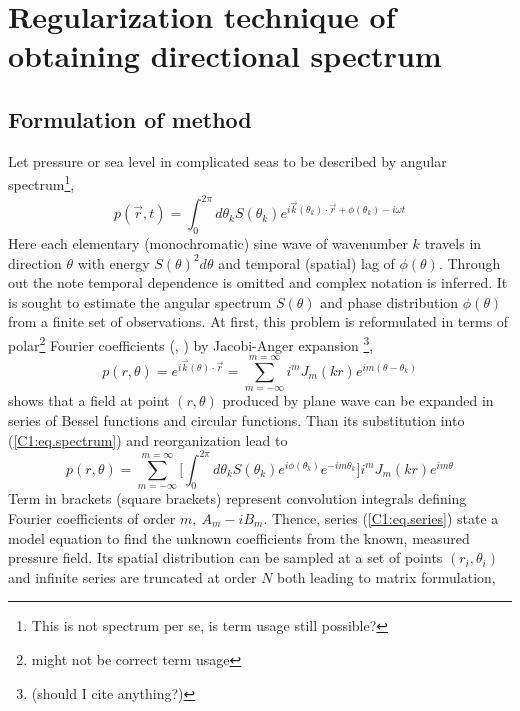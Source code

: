\section{Regularization technique of obtaining directional spectrum}
\subsection{Formulation of method}
Let pressure or sea level in complicated seas to be described by angular spectrum\footnote{This is not spectrum per se, is term usage still possible?},
\begin{equation}
\label{C1:eq.spectrum}
p(\vec{r}, t) = \int_0^{2\pi}  d\theta_k S(\theta_k) e^{i \vec{k}(\theta_k) \cdot \vec{r} + \phi(\theta_k) - i \omega t}
\end{equation}
Here each elementary (monochromatic) sine wave of wavenumber $k$ travels in direction $\theta$ with energy $S(\theta)^2 d\theta$ and temporal (spatial) lag of $\phi(\theta)$. Through out the note temporal dependence is omitted and complex notation is inferred. It is sought to estimate the angular spectrum $S(\theta)$ and phase distribution $\phi(\theta)$ from a finite set of observations. At first, this problem is reformulated in terms of polar\footnote{might not be correct term usage} Fourier coefficients (\cite{benoit1997analysing}, \cite{rafaely2004plane}) by Jacobi-Anger expansion \footnote{(should I cite anything?)},
\begin{equation}
p(r, \theta) = e^{i \vec{k}(\theta) \cdot \vec{r}} = \sum_{m = -\infty}^{m = \infty} i^{m} J_{m}(k r) e^{im(\theta - \theta_k)}
\end{equation}
shows that a field at point $(r, \theta)$ produced by plane wave can be expanded in series of Bessel functions and circular functions. Than its substitution into (\ref{C1:eq.spectrum}) and reorganization lead to
\begin{equation}
\label{C1:eq.series}
p(r, \theta) = \sum_{m=-\infty}^{m=\infty} \big[ \int_0^{2\pi}  d\theta_k S(\theta_k) e^{i\phi(\theta_k)} e^{-im\theta_k} \big] i^m J_m(kr) e^{im\theta}
\end{equation}
Term in brackets (square brackets) represent convolution integrals defining Fourier coefficients of order $m,~A_m - i B_m$. Thence, series (\ref{C1:eq.series}) state a model equation to find the unknown coefficients from the known, measured pressure field. Its spatial distribution can be sampled at a set of points $(r_i, \theta_i)$ and infinite series are truncated at order $N$ both leading to matrix formulation,
